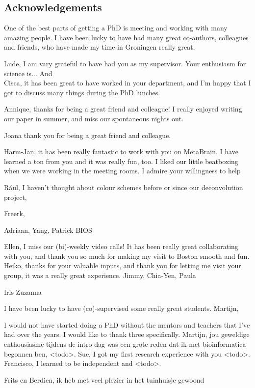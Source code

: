 \begin{appendices}
\chapter{Acknowledgements}

One of the best parts of getting a PhD is meeting and working with many amazing people. I have been lucky to have had many great co-authors, colleagues and friends, who have made my time in Groningen really great.

Lude, I am vary grateful to have had you as my supervisor. Your enthusiasm for science is... And \\
Cisca, it has been great to have worked in your department, and I'm happy that I got to discuss many things during the PhD lunches.

Annique, thanks for being a great friend and colleague! I really enjoyed writing our paper in summer, and miss our spontaneous nights out. 

Joana thank you for being a great friend and colleague. 

Harm-Jan, it has been really fantastic to work with you on MetaBrain. I have learned a ton from you and it was really fun, too. I liked our little beatboxing when we were working in the meeting rooms. I admire your willingness to help 

R\'aul, I haven't thought about colour schemes before or since our deconvolution project, 

Freerk,

Adriaan,
Yang, 
Patrick
BIOS


Ellen, I miss our (bi)-weekly video calls! It has been really great collaborating with you, and thank you so much for making my visit to Boston smooth and fun. Heiko, thanks for your valuable inputs, and thank you for letting me visit your group, it was a really great experience. Jimmy, Chia-Yen, Paula

Iris
Zuzanna

I have been lucky to have (co)-supervised some really great students. Martijn, 

I would not have started doing a PhD without the mentors and teachers that I've had over the years. I would like to thank three specifically. Martijn, jou geweldige enthousiasme tijdens de intro dag was een grote reden dat ik met bioinformatica begonnen ben, <todo>. Sue, I got my first research experience with you <todo>. Francisco, I learned to be independent and <todo>.

Frits en Berdien, ik heb met veel plezier in het tuinhuisje gewoond


\end{appendices}
